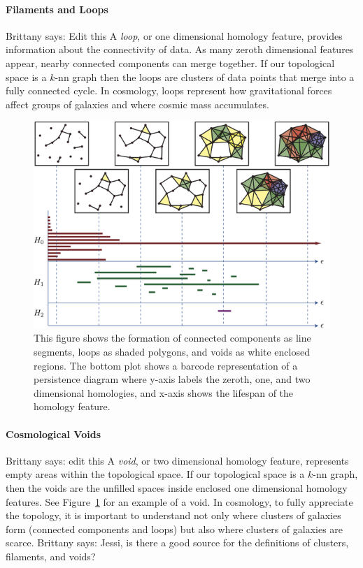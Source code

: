 \documentclass[12pt]{article}
\newcommand{\brittany}[1]{{\color{cyan} Brittany says: #1}}
\newcommand{\figref}[1]{Figure~\ref{#1}}
\begin{document}
\paragraph{Filaments and Loops} \brittany{Edit this} A \emph{loop}, or one dimensional homology feature, provides information about the connectivity of data. As many zeroth dimensional features appear, nearby connected components can merge together. If our topological space is a $k$-nn graph then the loops are clusters of data points that merge into a fully connected cycle. In cosmology, loops represent how gravitational forces affect groups of galaxies and where cosmic mass accumulates.

\begin{center}
\begin{figure}[htp!]
  \centering
  \includegraphics[width=\linewidth]{homologyobjects.png}
    \caption{This figure shows the formation of connected components as line segments, loops as shaded polygons, and voids as white enclosed regions. The bottom plot shows a barcode representation of a persistence diagram where y-axis labels the zeroth, one, and two dimensional homologies, and x-axis shows the lifespan of the homology feature.}
    \label{fig:homologydemo}
\end{figure}
\end{center}

\paragraph{Cosmological Voids} \brittany{edit this} A \emph{void}, or two dimensional homology feature, represents empty areas within the topological space. If our topological space is a $k$-nn graph, then the voids are the unfilled spaces inside enclosed one dimensional homology features. See \figref{fig:homologydemo} for an example of a void. In cosmology, to fully appreciate the topology, it is important to understand not only where clusters of galaxies form (connected components and loops) but also where clusters of galaxies are scarce. \brittany{Jessi, is there a good source for the definitions of clusters, filaments, and voids?}
\end{document}
